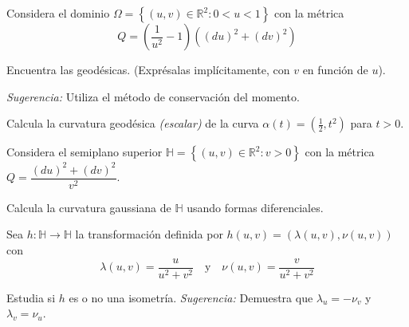 \begin{problem}

Considera el dominio $\Omega = \left\{(u,v) \in \mathbb{R}^2 : 0<u<1\right\}$ con la métrica
\begin{equation*}
Q = \left(\dfrac{1}{u^2} - 1\right)\left((du)^2 + (dv)^2\right)
\end{equation*}

\ppart Encuentra las geodésicas. (Exprésalas implícitamente, con $v$ en función de $u$).

\textit{Sugerencia:} Utiliza el método de conservación del momento.

\ppart Calcula la curvatura geodésica \textit{(escalar)} de la curva $\alpha(t) = (\frac{1}{2}, t^2)$ para $t>0$.

\solution
	
\end{problem}





\begin{problem}
Considera el semiplano superior $\mathbb{H} = \left\{(u,v) \in \mathbb{R}^2 : v > 0\right\}$ con la métrica $Q = \dfrac{(du)^2 + (dv)^2}{v^2}$.

\ppart Calcula la curvatura gaussiana de $\mathbb{H}$ usando formas diferenciales.

\ppart Sea $h:\mathbb{H} \rightarrow \mathbb{H}$ la transformación definida por $h(u,v)=(\lambda(u, v), \nu(u, v))$ con
\begin{equation*}
\lambda(u,v) = \dfrac{u}{u^2+v^2} \quad \text{y} \quad \nu(u, v) = \dfrac{v}{u^2+v^2}
\end{equation*}

Estudia si $h$ es o no una isometría. \textit{Sugerencia:} Demuestra que $\lambda_u = -\nu_v$ y $\lambda_v = \nu_u$.

\solution

\end{problem}
